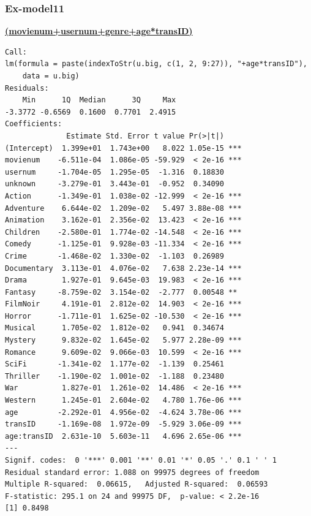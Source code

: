\documentclass[11pt]{article}
\begin{document}
\subsubsection{Ex-model11}
\textbf{\underline{(movienum+usernum+genre+age*transID)}}
\begin{verbatim}
Call:
lm(formula = paste(indexToStr(u.big, c(1, 2, 9:27)), "+age*transID"),
    data = u.big)
Residuals:
    Min      1Q  Median      3Q     Max 
-3.3772 -0.6569  0.1600  0.7701  2.4915 
Coefficients:
              Estimate Std. Error t value Pr(>|t|)    
(Intercept)  1.399e+01  1.743e+00   8.022 1.05e-15 ***
movienum    -6.511e-04  1.086e-05 -59.929  < 2e-16 ***
usernum     -1.704e-05  1.295e-05  -1.316  0.18830    
unknown     -3.279e-01  3.443e-01  -0.952  0.34090    
Action      -1.349e-01  1.038e-02 -12.999  < 2e-16 ***
Adventure    6.644e-02  1.209e-02   5.497 3.88e-08 ***
Animation    3.162e-01  2.356e-02  13.423  < 2e-16 ***
Children    -2.580e-01  1.774e-02 -14.548  < 2e-16 ***
Comedy      -1.125e-01  9.928e-03 -11.334  < 2e-16 ***
Crime       -1.468e-02  1.330e-02  -1.103  0.26989    
Documentary  3.113e-01  4.076e-02   7.638 2.23e-14 ***
Drama        1.927e-01  9.645e-03  19.983  < 2e-16 ***
Fantasy     -8.759e-02  3.154e-02  -2.777  0.00548 ** 
FilmNoir     4.191e-01  2.812e-02  14.903  < 2e-16 ***
Horror      -1.711e-01  1.625e-02 -10.530  < 2e-16 ***
Musical      1.705e-02  1.812e-02   0.941  0.34674    
Mystery      9.832e-02  1.645e-02   5.977 2.28e-09 ***
Romance      9.609e-02  9.066e-03  10.599  < 2e-16 ***
SciFi       -1.341e-02  1.177e-02  -1.139  0.25461    
Thriller    -1.190e-02  1.001e-02  -1.188  0.23480    
War          1.827e-01  1.261e-02  14.486  < 2e-16 ***
Western      1.245e-01  2.604e-02   4.780 1.76e-06 ***
age         -2.292e-01  4.956e-02  -4.624 3.78e-06 ***
transID     -1.169e-08  1.972e-09  -5.929 3.06e-09 ***
age:transID  2.631e-10  5.603e-11   4.696 2.65e-06 ***
---
Signif. codes:  0 '***' 0.001 '**' 0.01 '*' 0.05 '.' 0.1 ' ' 1
Residual standard error: 1.088 on 99975 degrees of freedom
Multiple R-squared:  0.06615,   Adjusted R-squared:  0.06593
F-statistic: 295.1 on 24 and 99975 DF,  p-value: < 2.2e-16
[1] 0.8498
\end{verbatim}
\end{document}
